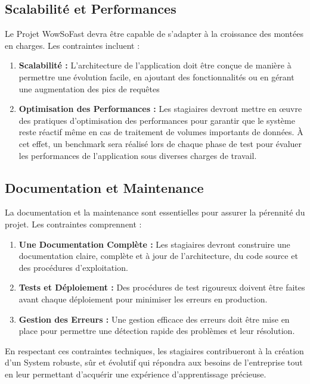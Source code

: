 \subsection{Scalabilité et Performances}
Le Projet WowSoFast devra être capable de s'adapter à la croissance des montées en charges. Les contraintes incluent :
\begin{enumerate}
    \item \textbf{Scalabilité :} L'architecture de l'application doit être conçue de manière à permettre une évolution facile, en ajoutant des fonctionnalités ou en gérant une augmentation des pics de requêtes
    \item \textbf{Optimisation des Performances :} Les stagiaires devront mettre en œuvre des pratiques d'optimisation des performances pour garantir que le système reste réactif même en cas de traitement de volumes importants de données. À cet effet, un benchmark sera réalisé lors de chaque phase de test pour évaluer les performances de l'application sous diverses charges de travail.
\end{enumerate}

\subsection{Documentation et Maintenance}
La documentation et la maintenance sont essentielles pour assurer la pérennité du projet. Les contraintes comprennent :
\begin{enumerate}
    \item \textbf{Une Documentation Complète :} Les stagiaires devront construire une documentation claire, complète et à jour de l'architecture, du code source et des procédures d'exploitation.
    \item \textbf{Tests et Déploiement :} Des procédures de test rigoureux doivent être faites avant chaque déploiement pour minimiser les erreurs en production.
    \item \textbf{Gestion des Erreurs :} Une gestion efficace des erreurs doit être mise en place pour permettre une détection rapide des problèmes et leur résolution.
\end{enumerate}

\vspace{1cm}

En respectant ces contraintes techniques, les stagiaires contribueront à la création d'un System robuste, sûr et évolutif qui répondra aux besoins de l'entreprise tout en leur permettant d'acquérir une expérience d'apprentissage précieuse.

